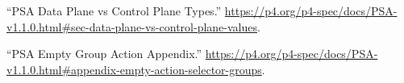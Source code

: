 \documentclass[11pt]{article}
\begin{document}
{{\begin{thebibliography}{45}
\mdbibitemlabel{{}[29]}\textquotedblleft{}PSA Data Plane vs Control Plane Types.\textquotedblright{} \href{https://p4.org/p4-spec/docs/PSA-v1.1.0.html\%23sec-data-plane-vs-control-plane-values}{{\ttfamily https://\hspace{0pt}p4.\hspace{0pt}org/\hspace{0pt}p4-\hspace{0pt}spec/\hspace{0pt}docs/\hspace{0pt}PSA-\hspace{0pt}v1.\hspace{0pt}1.\hspace{0pt}0.\hspace{0pt}html\#\hspace{0pt}sec-\hspace{0pt}data-\hspace{0pt}plane-\hspace{0pt}vs-\hspace{0pt}control-\hspace{0pt}plane-\hspace{0pt}values}}.\label{psatranslation}%

\mdbibitemlabel{{}[30]}\textquotedblleft{}PSA Empty Group Action Appendix.\textquotedblright{} \href{https://p4.org/p4-spec/docs/PSA-v1.1.0.html\%23appendix-empty-action-selector-groups}{{\ttfamily https://\hspace{0pt}p4.\hspace{0pt}org/\hspace{0pt}p4-\hspace{0pt}spec/\hspace{0pt}docs/\hspace{0pt}PSA-\hspace{0pt}v1.\hspace{0pt}1.\hspace{0pt}0.\hspace{0pt}html\#\hspace{0pt}appendix-\hspace{0pt}empty-\hspace{0pt}action-\hspace{0pt}selector-\hspace{0pt}groups}}.\label{psaemptygroupactionappendix}%


\end{thebibliography}}}
\end{document}
